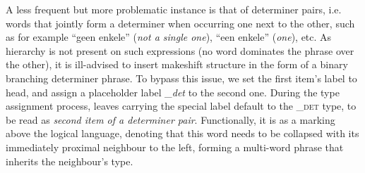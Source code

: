 A less frequent but more problematic instance is that of determiner pairs, i.e. words that jointly form a determiner when occurring one next to the other, such as for example ``geen enkele'' (\textit{not a single one}), ``een enkele'' (\textit{one}), etc.
As hierarchy is not present on such expressions (no word dominates the phrase over the other), it is ill-advised to insert makeshift structure in the form of a binary branching determiner phrase.
To bypass this issue, we set the first item's label to head, and assign a placeholder label \textit{\_det} to the second one. 
During the type assignment process, leaves carrying the special label default to the \textsc{\_det} type, to be read as \textit{second item of a determiner pair}. 
Functionally, it is as a marking above the logical language, denoting that this word needs to be collapsed with its immediately proximal neighbour to the left, forming a multi-word phrase that inherits the neighbour's type.


